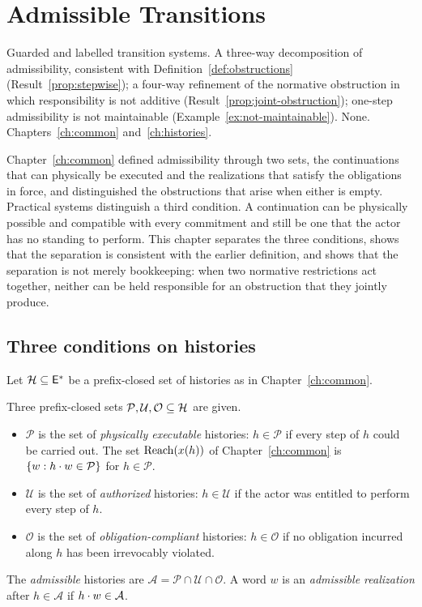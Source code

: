 \chapter{Admissible Transitions}\label{ch:admissible}
{Guarded and labelled transition systems.}
{A three-way decomposition of admissibility, consistent with Definition~\ref{def:obstructions} (Result~\ref{prop:stepwise}); a four-way refinement of the normative obstruction in which responsibility is not additive (Result~\ref{prop:joint-obstruction}); one-step admissibility is not maintainable (Example~\ref{ex:not-maintainable}).}
{None.}
{Chapters~\ref{ch:common} and~\ref{ch:histories}.}

Chapter~\ref{ch:common} defined admissibility through two sets, the continuations that can physically be executed and the realizations that satisfy the obligations in force, and distinguished the obstructions that arise when either is empty. Practical systems distinguish a third condition. A continuation can be physically possible and compatible with every commitment and still be one that the actor has no standing to perform. This chapter separates the three conditions, shows that the separation is consistent with the earlier definition, and shows that the separation is not merely bookkeeping: when two normative restrictions act together, neither can be held responsible for an obstruction that they jointly produce.

\section{Three conditions on histories}

Let $\mathcal{H}\subseteq\mathsf{E}^{*}$ be a prefix-closed set of histories as in Chapter~\ref{ch:common}.

\begin{definition}\label{def:three-sets}
Three prefix-closed sets $\mathcal P,\mathcal U,\mathcal O\subseteq\mathcal{H}$ are given.
\begin{itemize}[nosep]
  \item $\mathcal P$ is the set of \emph{physically executable} histories: $h\in\mathcal P$ if every step of $h$ could be carried out. The set $\operatorname{Reach}(x(h))$ of Chapter~\ref{ch:common} is $\{w: h\cdot w\in\mathcal P\}$ for $h\in\mathcal P$.
  \item $\mathcal U$ is the set of \emph{authorized} histories: $h\in\mathcal U$ if the actor was entitled to perform every step of $h$.
  \item $\mathcal O$ is the set of \emph{obligation-compliant} histories: $h\in\mathcal O$ if no obligation incurred along $h$ has been irrevocably violated.
\end{itemize}
The \emph{admissible} histories are $\mathcal A=\mathcal P\cap\mathcal U\cap\mathcal O$. A word $w$ is an \emph{admissible realization} after $h\in\mathcal A$ if $h\cdot w\in\mathcal A$.
\end{definition}

